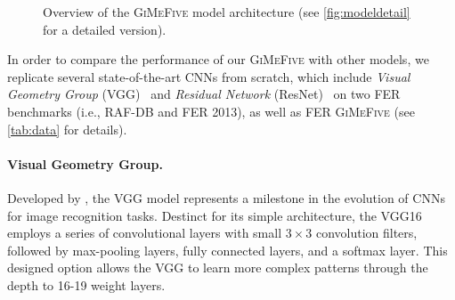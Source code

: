\begin{figure}[ht]
  \centering
  \caption{Overview of the \textsc{GiMeFive} model architecture 
  (see \cref{fig:modeldetail} for a detailed version).} 
  \label{fig:model}
\end{figure}

In order to compare the performance of our \textsc{GiMeFive} with other models, 
we replicate several state-of-the-art CNNs from scratch, 
which include \textit{Visual Geometry Group} (VGG)~\cite{SimonyanZ14a} and 
\textit{Residual Network} (ResNet)~\cite{HeZRS16} on two FER benchmarks (i.e., RAF-DB and FER 2013), 
as well as FER \textsc{GiMeFive} (see \cref{tab:data} for details). 

\paragraph{Visual Geometry Group.}
Developed by \citet{SimonyanZ14a}, 
the VGG model represents a milestone in the evolution of CNNs for image recognition tasks. 
Destinct for its simple architecture, 
the VGG16 employs a series of convolutional layers with small $3 \times 3$ convolution filters, 
followed by max-pooling layers, fully connected layers, and a softmax layer. 
This designed option allows the VGG to learn more complex patterns through the depth to 16-19 weight layers. 

